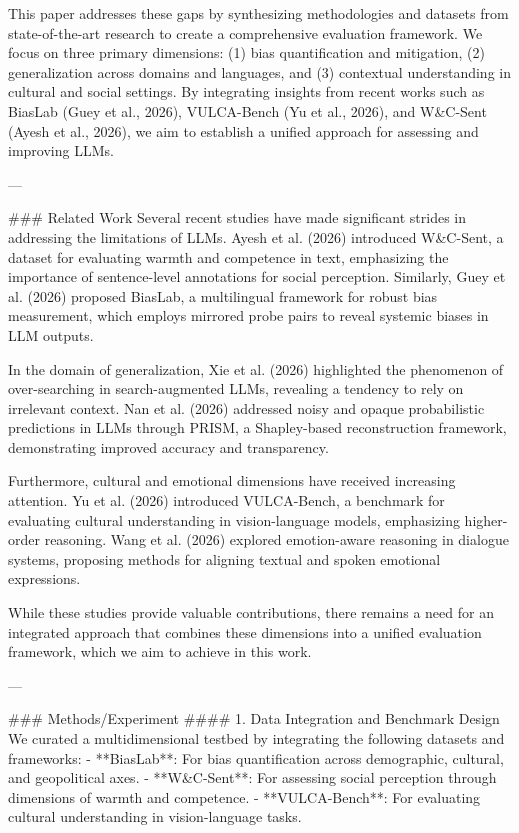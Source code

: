This paper addresses these gaps by synthesizing methodologies and datasets from state-of-the-art research to create a comprehensive evaluation framework. We focus on three primary dimensions: (1) bias quantification and mitigation, (2) generalization across domains and languages, and (3) contextual understanding in cultural and social settings. By integrating insights from recent works such as BiasLab (Guey et al., 2026), VULCA-Bench (Yu et al., 2026), and W&C-Sent (Ayesh et al., 2026), we aim to establish a unified approach for assessing and improving LLMs.

---

### Related Work  
Several recent studies have made significant strides in addressing the limitations of LLMs. Ayesh et al. (2026) introduced W&C-Sent, a dataset for evaluating warmth and competence in text, emphasizing the importance of sentence-level annotations for social perception. Similarly, Guey et al. (2026) proposed BiasLab, a multilingual framework for robust bias measurement, which employs mirrored probe pairs to reveal systemic biases in LLM outputs.

In the domain of generalization, Xie et al. (2026) highlighted the phenomenon of over-searching in search-augmented LLMs, revealing a tendency to rely on irrelevant context. Nan et al. (2026) addressed noisy and opaque probabilistic predictions in LLMs through PRISM, a Shapley-based reconstruction framework, demonstrating improved accuracy and transparency.

Furthermore, cultural and emotional dimensions have received increasing attention. Yu et al. (2026) introduced VULCA-Bench, a benchmark for evaluating cultural understanding in vision-language models, emphasizing higher-order reasoning. Wang et al. (2026) explored emotion-aware reasoning in dialogue systems, proposing methods for aligning textual and spoken emotional expressions.

While these studies provide valuable contributions, there remains a need for an integrated approach that combines these dimensions into a unified evaluation framework, which we aim to achieve in this work.

---

### Methods/Experiment  
#### 1. Data Integration and Benchmark Design  
We curated a multidimensional testbed by integrating the following datasets and frameworks:  
- **BiasLab**: For bias quantification across demographic, cultural, and geopolitical axes.  
- **W&C-Sent**: For assessing social perception through dimensions of warmth and competence.  
- **VULCA-Bench**: For evaluating cultural understanding in vision-language tasks.  


